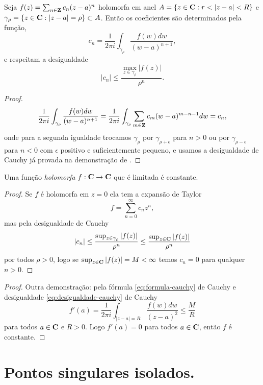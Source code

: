 \begin{teorema}
Seja $f(z) = \sum_{n\in\mathbf{Z}} c_n (z-a)^n$ holomorfa em anel
$A = \{ z\in\mathbf{C} : r < |z-a| < R \}$ e $\gamma_\rho = \{ z\in\mathbf{C} : |z-a|=\rho \} \subset A$.
Então os coeficientes são determinados pela função,
\begin{equation}
c_n = \frac1{2\pi i} \int_{\gamma_\rho} \frac{f(w) dw}{(w-a)^{n+1}},
\end{equation}
e respeitam a desigualdade
\begin{equation}
\label{eq:desigualdade-cauchy}
|c_n| \leq \frac{\max_{z\in\gamma_\rho} |f(z)|}{\rho^n}.
\end{equation}
\end{teorema}
\begin{proof}
\[ \frac1{2\pi i} \int_{\gamma_\rho} \frac{f(w) dw}{(w-a)^{n+1}}
 = \frac1{2\pi i} \int_{\gamma_\rho} \sum_{m\in\mathbf{Z}} c_m (w-a)^{m-n-1} dw 
 = c_n, 
\]
onde para a segunda igualdade trocamos $\gamma_\rho$ por $\gamma_{\rho+\epsilon}$ para
$n>0$ ou por $\gamma_{\rho-\epsilon}$ para $n<0$ com $\epsilon$ positivo e suficientemente pequeno,
e usamos a desigualdade de Cauchy já provada na demonstração de .
\end{proof}

\begin{teorema}[Liouville]
\label{t:liouville}
Uma função \emph{holomorfa} $f: \mathbf{C} \to \mathbf{C}$ que é limitada é constante.
\end{teorema}
\begin{proof}
Se $f$ é holomorfa em $z=0$ ela tem a expansão de Taylor
\[ f = \sum_{n=0}^\infty c_n z^n, \]
mas pela desigualdade de Cauchy
\[ |c_n| \leq  \frac{\sup_{z\in\gamma_\rho} |f(z)|}{\rho^n} \leq \frac{\sup_{z\in\mathbf{C}} |f(z)|}{\rho^n} \]
por todos $\rho > 0$, logo se $\sup_{z\in\mathbf{C}} |f(z)| = M < \infty$ temos $c_n = 0$ para qualquer $n>0$.
\end{proof}
\begin{proof}
Outra demonstração: pela fórmula \eqref{eq:formula-cauchy} de Cauchy
e desigualdade \eqref{eq:desigualdade-cauchy} de Cauchy
\[ f'(a) = \frac{1}{2\pi i} \int_{|z-a|=R} \frac{f(w)dw}{(z-a)^2} \leq \frac{M}{R} \]
para todos $a\in \mathbf{C}$ e $R>0$. Logo $f'(a) = 0$ para todos $a\in \mathbf{C}$, então $f$ é constante.
\end{proof}

\section{Pontos singulares isolados.}

